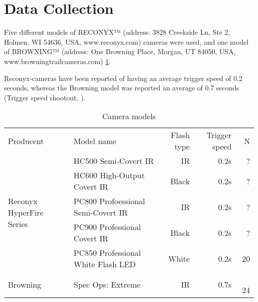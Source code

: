 \section{Data Collection} %

Five different models of RECONYX™ (address: 3828 Creekside Ln, Ste 2, Holmen, WI 54636, USA, www.reconyx.com) cameras were used, 
and one model of BROWNING™ (address: One Browning Place, Morgan, UT 84050, USA, www.browningtrailcameras.com) \ref{tab:cam_mod}.

Reconyx-cameras have been reported of having an average trigger speed of 0.2 seconds, whereas the Browning model was reported an average of 0.7 seconds (Trigger speed shootout, \cite{Trailcampro2014}).


\begin{table}
\caption{\label{tab:cam_mod} Camera models}
\centering

\begin{tabular}{llrrr}
\hline
Producent  & Model name & Flash type & Trigger speed & N \\
\cline{1-2}
\multirow{5}{2cm}{Reconyx HyperFire Series} &
	  HC500 Semi-Covert IR					& IR	& 0.2s &  ? \\
	& HC600 High-Output Covert IR			& Black	& 0.2s &  ? \\
    & PC800 Profoessional Semi-Covert IR 	& IR	& 0.2s &  ? \\
    & PC900 Professional Covert IR 		& Black	& 0.2s &  ? \\
    & PC850 Professional White Flash LED	& White	& 0.2s &  20 \\
\cline{1-2}
Browning  & Spec Ops: Extreme 				& IR	& 0.7s & ~ 24  \\
\hline
\end{tabular}

\end{table}



